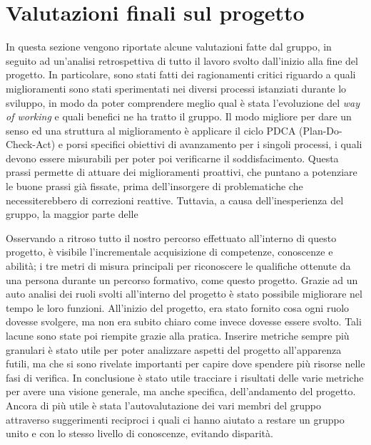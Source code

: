 
\section{Valutazioni finali sul progetto}
	In questa sezione vengono riportate alcune valutazioni fatte dal gruppo, in seguito ad un'analisi retrospettiva di tutto il lavoro svolto dall'inizio alla fine del progetto. In particolare, sono stati fatti dei ragionamenti critici riguardo a quali miglioramenti sono stati sperimentati nei diversi processi istanziati durante lo sviluppo, in modo da poter comprendere meglio qual è stata l'evoluzione del \textit{way of working} e quali benefici ne ha tratto il gruppo.
	\newline\newline
	Il modo migliore per dare un senso ed una struttura al miglioramento è applicare il ciclo PDCA (Plan-Do-Check-Act) e porsi specifici obiettivi di avanzamento per i singoli processi, i quali devono essere misurabili per poter poi verificarne il soddisfacimento. Questa prassi permette di attuare dei miglioramenti proattivi, che puntano a potenziare le buone prassi già fissate, prima dell'insorgere di problematiche che necessiterebbero di correzioni reattive.
	Tuttavia, a causa dell'inesperienza del gruppo, la maggior parte delle 
	
	Osservando a ritroso tutto il nostro percorso effettuato all’interno di questo progetto, è visibile l’incrementale acquisizione di competenze, conoscenze e abilità; i tre metri di misura principali per riconoscere le qualifiche ottenute da una persona durante un percorso formativo, come questo progetto.
	\newline
	Grazie ad un auto analisi dei ruoli svolti all’interno del progetto è stato possibile migliorare nel tempo le loro funzioni. All’inizio del progetto, era stato fornito cosa ogni ruolo dovesse svolgere, ma non era subito chiaro come invece dovesse essere svolto. Tali lacune sono state poi riempite grazie alla pratica.
	\newline
	Inserire metriche sempre più granulari è stato utile per poter analizzare aspetti del progetto all’apparenza futili, ma che si sono rivelate importanti per capire dove spendere più risorse nelle fasi di verifica.
	\newline
	In conclusione è stato utile tracciare i risultati delle varie metriche per avere una visione generale, ma anche specifica, dell’andamento del progetto. Ancora di più utile è stata l’autovalutazione dei vari membri del gruppo attraverso suggerimenti reciproci i quali ci hanno aiutato a restare un gruppo unito e con lo stesso livello di conoscenze, evitando disparità.
